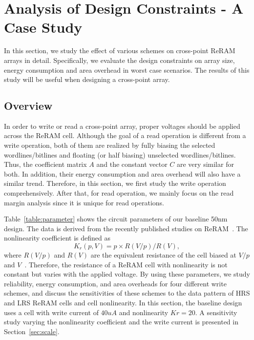 \vspace{-4pt}
\section{Analysis of Design Constraints - A Case Study}\label{sec:w_and_r}

In this section, we study the effect of various schemes on cross-point
ReRAM arrays in detail. Specifically, we evaluate the design constraints
on array size, energy consumption and area overhead in worst case
scenarios. The results of this study will be useful when designing a
cross-point array.

\vspace{-10pt}
\subsection{Overview}
In order to write or read a cross-point array, proper voltages should be
applied across the ReRAM cell. Although the goal of a read operation is
different from a write operation, both of them are realized by fully
biasing the selected wordlines/bitlines and floating (or half biasing)
unselected wordlines/bitlines. Thus, the coefficient matrix $A$ and the
constant vector $C$ are very similar for both. In addition, their energy
consumption and area overhead will also have a similar trend. Therefore,
in this section, we first study the write operation comprehensively. After
that, for read operation, we mainly focus on the read margin analysis
since it is unique for read operations.

Table~\ref{table:parameter} shows the circuit parameters of our baseline
50nm design. The data is derived from the recently published studies on
ReRAM~\cite{ReRAM_overview,memristor:Cong,ReRAM_Renesas}. The nonlinearity
coefficient is defined as
\begin{equation}
K_r(p,V) = p \times R(V/p)/R(V),
\end{equation}
where $R(V/p)$ and $R(V)$ are the equivalent resistance of the cell biased
at $V/p$ and $V$~\cite{memristor:Cong}. Therefore, the resistance of a
ReRAM cell with nonlinearity is not constant but varies with the applied
voltage. By using these parameters, we study reliability, energy
consumption, and area overheads for four different write schemes, and
discuss the sensitivities of these schemes to the data pattern of HRS and
LRS ReRAM cells and cell nonlinearity. In this section, the baseline
design uses a cell with write current of $40 uA$ and nonlinearity
$Kr=20$. A sensitivity study varying the nonlinearity
coefficient and the write current is presented in Section~\ref{sec:scale}.

